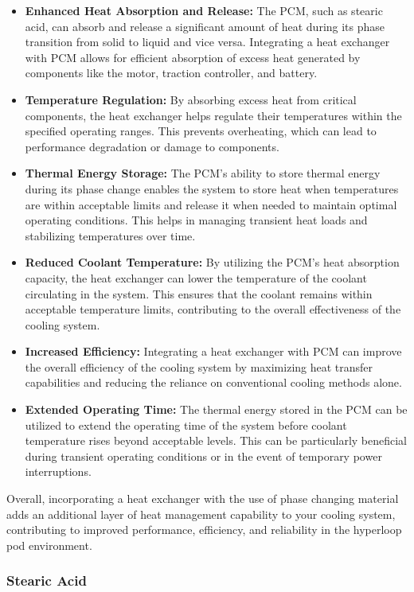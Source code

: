 \begin{itemize}
  \item \textbf{Enhanced Heat Absorption and Release:} The PCM, such as stearic acid, can absorb and release a significant amount of heat during its phase transition from solid to liquid and vice versa. Integrating a heat exchanger with PCM allows for efficient absorption of excess heat generated by components like the motor, traction controller, and battery.
  \item \textbf{Temperature Regulation:} By absorbing excess heat from critical components, the heat exchanger helps regulate their temperatures within the specified operating ranges. This prevents overheating, which can lead to performance degradation or damage to components.
  \item \textbf{Thermal Energy Storage:} The PCM's ability to store thermal energy during its phase change enables the system to store heat when temperatures are within acceptable limits and release it when needed to maintain optimal operating conditions. This helps in managing transient heat loads and stabilizing temperatures over time.
  \item \textbf{Reduced Coolant Temperature:} By utilizing the PCM's heat absorption capacity, the heat exchanger can lower the temperature of the coolant circulating in the system. This ensures that the coolant remains within acceptable temperature limits, contributing to the overall effectiveness of the cooling system.
  \item \textbf{Increased Efficiency:} Integrating a heat exchanger with PCM can improve the overall efficiency of the cooling system by maximizing heat transfer capabilities and reducing the reliance on conventional cooling methods alone.
  \item \textbf{Extended Operating Time:} The thermal energy stored in the PCM can be utilized to extend the operating time of the system before coolant temperature rises beyond acceptable levels. This can be particularly beneficial during transient operating conditions or in the event of temporary power interruptions.
\end{itemize}

Overall, incorporating a heat exchanger with the use of phase changing material adds an additional layer of heat management capability to your cooling system, contributing to improved performance, efficiency, and reliability in the hyperloop pod environment.


\subsubsection{Stearic Acid}

